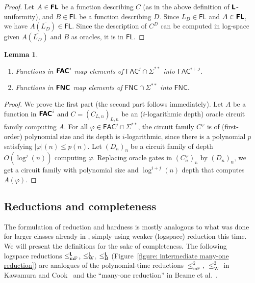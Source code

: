 \documentclass[conference]{IEEEtran}
\newcommand{\classonefont}[1]{\mathsf{#1}}
\newcommand{\classFL}{\classonefont{FL}}
\newcommand{\classFNC}{\classonefont{FNC}}
\newcommand{\classFAC}{\classonefont{FAC}}
\newcommand{\classtwofont}[1]{\text{\bfseries \sffamily \upshape #1}}
\newcommand{\classLtwo}{\classtwofont{L}}
\newcommand{\classFLtwo}{\classtwofont{FL}}
\newcommand{\classFNCtwo}{\classtwofont{FNC}}
\newcommand{\classFACtwo}{\classtwofont{FAC}}
\newcommand{\redW}{\leq _{\mathrm W}}
\newcommand{\redmF}{\leq _{\mathrm{mF}}}
\newcommand{\redB}{\leq _{\mathrm B}}
\newcommand{\redLW}{\redW ^{\classLtwo}}
\newcommand{\redLmF}{\redmF ^{\classLtwo}}
\newcommand{\redLB}{\redB ^{\classLtwo}}
\newcommand{\LM}{\varSigma ^{**}}
\newtheorem{lemma}[theorem]{Lemma}
\theoremstyle{definition}
\theoremstyle{remark}
\begin{document}
\begin{proof}
 Let $A \in \classFLtwo$ be a function 
 describing $C$ (as in the above definition of $\classLtwo$-uniformity), 
 and 
 $B \in \classFL$ be a function 
 describing $D$.
 Since $\overline{L _D} \in \classFL$ and $A \in \classFLtwo$, 
 we have $A(\overline{L _D}) \in \classFL$. 
 Since the description of $C ^D$ can be computed in log-space
 given $A(\overline{L _D})$ and $B$ as oracles, 
 it is in $\classFL$. 
\end{proof}

\begin{lemma}
\label{lemma: type-one and type-two circuit classes}
\begin{enumerate}
 \item Functions in $\classFACtwo^i$ 
       map elements of $\classFAC^j \cap \LM$ 
       into $\classFAC^{i+j}$.
 \item Functions in $\classFNCtwo$
       map elements of $\classFNC \cap \LM$ 
       into $\classFNC$.
\end{enumerate}
\end{lemma}

\begin{proof}
We prove the first part (the second part follows immediately).
Let $A$ be a function in $\classFACtwo^i$ and $C = (C_{L,n})_{L,n}$ be an 
($i$-logarithmic depth) oracle circuit family computing $A$. 
For all $\varphi \in \classFAC^j \cap \LM$, 
the circuit family $C ^\varphi$ is 
of (first-order) polynomial size and its depth is $i$-logarithmic,
since there is a polynomial $p$ satisfying $|\varphi|(n) \le p(n)$.
Let $(D_n)_n$ be a circuit family of depth $O(\log^j(n))$
computing $\varphi$.
Replacing oracle gates in $(C^\varphi_n)_n$ by $(D_n)_n$, 
we get a circuit family with polynomial size and $\log^{i+j}(n)$ depth
that computes $A(\varphi)$.
\end{proof}

\subsection{Reductions and completeness}

The formulation of reduction and hardness 
is mostly analogous to what was done for larger classes 
already in \cite{kawamura2012complexity}, 
simply using weaker (logspace) reduction this time. 
We will present the definitions for the sake of completeness. 
The following logspace reductions $\redLmF$, $\redLW$, $\redLB$
(Figure~\ref{figure: intermediate many-one reduction}) are
analogues of the polynomial-time reductions 
$\redmF^2$, $\redW^2$ in Kawamura and Cook~\cite{kawamura2012complexity}
and the ``many-one reduction'' in Beame et al.~\cite{beame1995relative}. 
\end{document}
